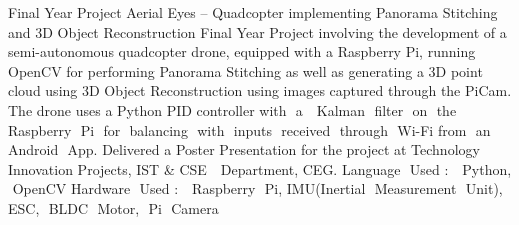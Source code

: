 

\begin{cventries}

  \cventry
    {Final Year Project} %
    {Aerial Eyes – Quadcopter implementing Panorama Stitching and 3D Object Reconstruction} %
    {} %
    {} %
    {
      \newline
      Final Year Project involving the development of a semi-autonomous quadcopter drone, equipped with a Raspberry Pi, running OpenCV for performing Panorama Stitching as well as generating a 3D point cloud using 3D Object Reconstruction using images captured through the PiCam. The drone uses a Python PID controller with​ ​ a ​ ​ Kalman​ ​ filter​ ​ on​ ​ the​ ​ Raspberry​ ​ Pi​ ​ for​ ​ balancing​ ​ with​ ​ inputs​ ​ received​ ​ through​ ​ Wi-Fi​ ​ from​ ​ an​ ​ Android​ ​ App. 
      Delivered a Poster Presentation for the project at Technology Innovation Projects, IST \& CSE ​ ​ Department, CEG.
      Language​ ​ Used​ : ​ ​ Python,​ ​ OpenCV
      Hardware​ ​ Used​ : ​ ​ Raspberry​ ​ Pi,​ ​ IMU(Inertial​ ​ Measurement​ ​ Unit),​ ​ ESC,​ ​ BLDC​ ​ Motor,​ ​ Pi​ ​ Camera
    }

\end{cventries}
